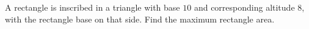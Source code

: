 A rectangle is inscribed in a triangle with base $10$ and corresponding altitude $8$, with the rectangle base on that side. Find the maximum rectangle area.

